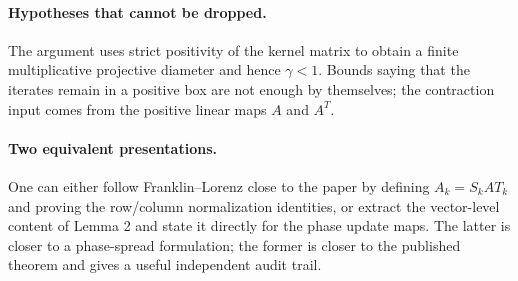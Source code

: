 \paragraph{Hypotheses that cannot be dropped.}
The argument uses strict positivity of the kernel matrix to obtain a finite
multiplicative projective diameter and hence $\gamma<1$.  Bounds saying that the
iterates remain in a positive box are not enough by themselves; the contraction input
comes from the positive linear maps $A$ and $A^T$.

\paragraph{Two equivalent presentations.}
One can either follow Franklin--Lorenz close to the paper by defining
$A_k=S_kAT_k$ and proving the row/column normalization identities, or extract the
vector-level content of Lemma 2 and state it directly for the phase update maps.
The latter is closer to a phase-spread formulation; the former is closer to
the published theorem and gives a useful independent audit trail.



